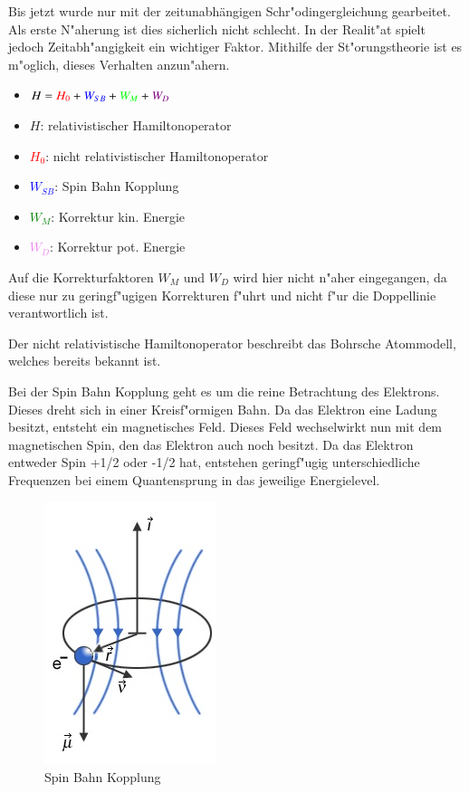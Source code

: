 \begin{refsection}
Bis jetzt wurde nur mit der zeitunabhängigen Schr"odingergleichung gearbeitet.
Als erste N"aherung ist dies sicherlich nicht schlecht.
In der Realit"at spielt jedoch Zeitabh"angigkeit ein wichtiger Faktor. 
Mithilfe der St"orungstheorie ist es m"oglich, dieses Verhalten anzun"ahern.

\begin{itemize}
	\item[]  $H = \textcolor{red}{H_0}+ \textcolor{blue}{W_{SB}} + 
		\textcolor{green}{W_M} + \textcolor{violet}{W_D} $
	\item[]  $H$: relativistischer Hamiltonoperator
	\item[]  \textcolor{red}{$H_0$}: nicht relativistischer Hamiltonoperator
	\item[]  \textcolor{blue}{$W_{SB}$}: Spin Bahn Kopplung
	\item[]  \textcolor{green}{$W_M$}: Korrektur kin. Energie
	\item[]  \textcolor{violet}{$W_D$}: Korrektur pot. Energie
	
\end{itemize}
		
Auf die Korrekturfaktoren $W_M$ und $W_D$ wird hier nicht n"aher eingegangen, da diese nur zu geringf"ugigen Korrekturen f"uhrt und nicht f"ur die Doppellinie verantwortlich ist.

Der nicht relativistische Hamiltonoperator beschreibt das Bohrsche  Atommodell, welches bereits bekannt ist.

Bei der Spin Bahn Kopplung geht es um die reine Betrachtung des Elektrons. 
Dieses dreht sich in einer Kreisf"ormigen Bahn. 
Da das Elektron eine Ladung besitzt, entsteht ein magnetisches Feld. 
Dieses Feld wechselwirkt nun mit dem magnetischen Spin, den das Elektron auch noch besitzt. 
Da das Elektron entweder Spin +1/2 oder -1/2 hat, entstehen geringf"ugig unterschiedliche Frequenzen bei einem Quantensprung in das jeweilige Energielevel.

\begin{figure}
	\centering
	\includegraphics[width=.2\columnwidth]{../vortrag/pictures/feinstrukturelektron.jpg}
	\caption{Spin Bahn Kopplung} %
	\label{atomuhr:spinbahn}
\end{figure}


\end{refsection}
